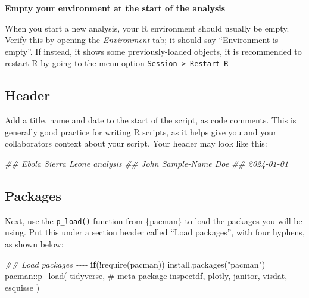 \documentclass[
  letterpaper,
  DIV=11,
  numbers=noendperiod]{scrreprt}
\newenvironment{Shaded}{\begin{snugshade}}{\end{snugshade}}
\newcommand{\CommentTok}[1]{\textcolor[rgb]{0.37,0.37,0.37}{#1}}
\newcommand{\ControlFlowTok}[1]{\textcolor[rgb]{0.00,0.23,0.31}{\textbf{#1}}}
\newcommand{\DocumentationTok}[1]{\textcolor[rgb]{0.37,0.37,0.37}{\textit{#1}}}
\newcommand{\FunctionTok}[1]{\textcolor[rgb]{0.28,0.35,0.67}{#1}}
\newcommand{\NormalTok}[1]{\textcolor[rgb]{0.00,0.23,0.31}{#1}}
\newcommand{\SpecialCharTok}[1]{\textcolor[rgb]{0.37,0.37,0.37}{#1}}
\newcommand{\StringTok}[1]{\textcolor[rgb]{0.13,0.47,0.30}{#1}}
\begin{document}
\begin{tcolorbox}[enhanced jigsaw, titlerule=0mm, colback=white, left=2mm, breakable, opacitybacktitle=0.6, colbacktitle=quarto-callout-note-color!10!white, colframe=quarto-callout-note-color-frame, bottomtitle=1mm, opacityback=0, coltitle=black, arc=.35mm, toptitle=1mm, title=\textcolor{quarto-callout-note-color}{\faInfo}\hspace{0.5em}{Side Note}, leftrule=.75mm, toprule=.15mm, bottomrule=.15mm, rightrule=.15mm]

\textbf{Empty your environment at the start of the analysis}

When you start a new analysis, your R environment should usually be
empty. Verify this by opening the \emph{Environment} tab; it should say
``Environment is empty''. If instead, it shows some previously-loaded
objects, it is recommended to restart R by going to the menu option
\texttt{Session\ \textgreater{}\ Restart\ R}

\end{tcolorbox}

\subsection{Header}\label{header}

Add a title, name and date to the start of the script, as code comments.
This is generally good practice for writing R scripts, as it helps give
you and your collaborators context about your script. Your header may
look like this:

\begin{Shaded}
\begin{Highlighting}[]
\DocumentationTok{\#\# Ebola Sierra Leone analysis}
\DocumentationTok{\#\# John Sample{-}Name Doe}
\DocumentationTok{\#\# 2024{-}01{-}01}
\end{Highlighting}
\end{Shaded}

\subsection{Packages}\label{packages-2}

Next, use the \texttt{p\_load()} function from \{pacman\} to load the
packages you will be using. Put this under a section header called
``Load packages'', with four hyphens, as shown below:

\begin{Shaded}
\begin{Highlighting}[]
\DocumentationTok{\#\# Load packages {-}{-}{-}{-}}
\ControlFlowTok{if}\NormalTok{(}\SpecialCharTok{!}\FunctionTok{require}\NormalTok{(pacman)) }\FunctionTok{install.packages}\NormalTok{(}\StringTok{"pacman"}\NormalTok{)}
\NormalTok{pacman}\SpecialCharTok{::}\FunctionTok{p\_load}\NormalTok{(}
\NormalTok{  tidyverse, }\CommentTok{\# meta{-}package}
\NormalTok{  inspectdf,}
\NormalTok{  plotly,}
\NormalTok{  janitor,}
\NormalTok{  visdat,}
\NormalTok{  esquisse}
\NormalTok{)}
\end{Highlighting}
\end{Shaded}
\end{document}

